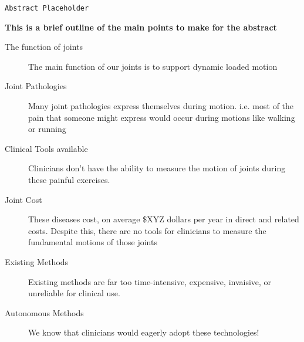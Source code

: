 \texttt{Abstract Placeholder}

{\bf \color{red} This is a brief outline of the main points to make for the abstract}

\begin{description}
    \item[The function of joints] The main function of our joints is to support dynamic loaded motion
    \item[Joint Pathologies] Many joint pathologies express themselves during motion. i.e. most of the pain that someone might express would occur during motions like walking or running
    \item[Clinical Tools available] Clinicians don't have the ability to measure the motion of joints during these painful exercises. 
    \item[Joint Cost] These diseases cost, on average \$XYZ dollars per year in direct and related costs. Despite this, there are no tools for clinicians to measure the fundamental motions of those joints
    \item[Existing Methods] Existing methods are far too time-intensive, expensive, invaisive, or unreliable for clinical use.
    \item[Autonomous Methods] We know that clinicians would eagerly adopt these technologies!  
\end{description}